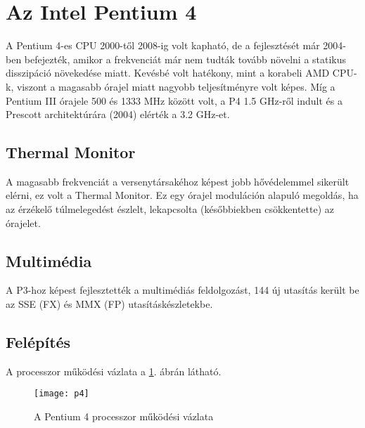 \section{Az Intel Pentium 4}
A Pentium 4-es CPU 2000-től 2008-ig volt kapható, de a fejlesztését már 2004-ben befejezték, amikor a frekvenciát már nem tudták tovább növelni a statikus disszipáció növekedése miatt.
Kevésbé volt hatékony, mint a korabeli AMD CPU-k, viszont a magasabb órajel miatt nagyobb teljesítményre volt képes.
Míg a Pentium III órajele 500 és 1333 MHz között volt, a P4 1.5 GHz-ről indult és a Prescott architektúrára (2004) elérték a 3.2 GHz-et.

\subsection{Thermal Monitor}
A magasabb frekvenciát a versenytársakéhoz képest jobb hővédelemmel sikerült elérni, ez volt a Thermal Monitor.
Ez egy órajel moduláción alapuló megoldás, ha az érzékelő túlmelegedést észlelt, lekapcsolta (későbbiekben csökkentette) az órajelet.

\subsection{Multimédia}
A P3-hoz képest fejlesztették a multimédiás feldolgozást, 144 új utasítás került be az SSE (FX) és MMX (FP) utasításkészletekbe.

\subsection{Felépítés}
A processzor működési vázlata a \ref{fig:p4}. ábrán látható.
\begin{figure}[h]
    \texttt{[image: p4]}
    \centering
    \caption{A Pentium 4 processzor működési vázlata}
    \label{fig:p4}
\end{figure}